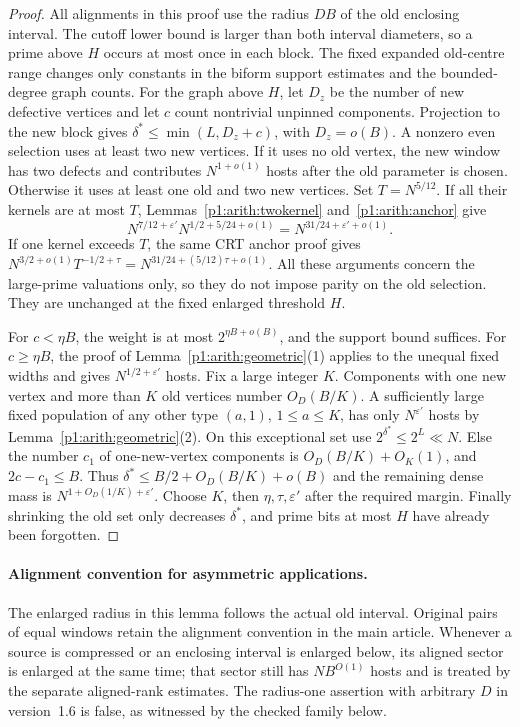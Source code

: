 \begin{proof}
All alignments in this proof use the radius $DB$ of the old enclosing
interval.  The cutoff lower bound is larger than both interval diameters,
so a prime above $H$ occurs at most once in each block.
The fixed expanded old-centre range changes only constants in the
biform support estimates and the bounded-degree graph counts.
For the graph above $H$, let $D_z$ be the number of new defective vertices
and let $c$ count nontrivial unpinned components.  Projection to the new
block gives $\delta^*\leq\min(L,D_z+c)$, with $D_z=o(B)$.
A nonzero even selection uses at least two new vertices.  If it uses no
old vertex, the new window has two defects and contributes $N^{1+o(1)}$
hosts after the old parameter is chosen.  Otherwise it uses at least one
old and two new vertices.  Set $T=N^{5/12}$.
If all their kernels are at most $T$, Lemmas~\ref{p1:arith:twokernel}
and~\ref{p1:arith:anchor} give
\[
 N^{7/12+\varepsilon'}N^{1/2+5/24+o(1)}=N^{31/24+\varepsilon'+o(1)}.
\]
If one kernel exceeds $T$, the same CRT anchor proof gives
$N^{3/2+o(1)}T^{-1/2+\tau}=N^{31/24+(5/12)\tau+o(1)}$.
All these arguments concern the large-prime valuations only, so they do
not impose parity on the old selection.  They are unchanged at the
fixed enlarged threshold $H$.

For $c<\eta B$, the weight is at most $2^{\eta B+o(B)}$, and the support
bound suffices.  For $c\geq\eta B$, the proof of
Lemma~\ref{p1:arith:geometric}(1) applies to the unequal fixed widths and
gives $N^{1/2+\varepsilon'}$ hosts.  Fix a large integer $K$.  Components
with one new vertex and more than $K$ old vertices number $O_D(B/K)$.
A sufficiently large fixed population of any other type $(a,1)$,
$1\leq a\leq K$, has only $N^{\varepsilon'}$ hosts by
Lemma~\ref{p1:arith:geometric}(2).  On this exceptional set use
$2^{\delta^*}\leq2^L\ll N$.  Else the number $c_1$ of one-new-vertex
components is $O_D(B/K)+O_K(1)$, and $2c-c_1\leq B$.  Thus
$\delta^*\leq B/2+O_D(B/K)+o(B)$ and the remaining dense mass is
$N^{1+O_D(1/K)+\varepsilon'}$.
Choose $K$, then $\eta,\tau,\varepsilon'$ after the required margin.
Finally shrinking the old set only decreases $\delta^*$, and prime bits
at most $H$ have already been forgotten.
\end{proof}

\paragraph{Alignment convention for asymmetric applications.}
The enlarged radius in this lemma follows the actual old interval.
Original pairs of equal windows retain the alignment convention in
the main article.  Whenever a source is compressed or an enclosing
interval is enlarged below, its aligned sector is enlarged at the
same time; that sector still has $NB^{O(1)}$ hosts and is treated by
the separate aligned-rank estimates.  The radius-one assertion with
arbitrary $D$ in version~1.6 is false, as witnessed by the checked
family below.

